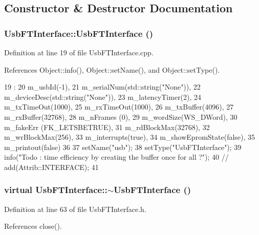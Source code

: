 \subsection{Constructor \& Destructor Documentation}
\hypertarget{classUsbFTInterface_aa0f871007821694c3e1f53f65cea8af4}{
\subsubsection[{UsbFTInterface}]{\setlength{\rightskip}{0pt plus 5cm}UsbFTInterface::UsbFTInterface ()}}
\label{classUsbFTInterface_aa0f871007821694c3e1f53f65cea8af4}


Definition at line 19 of file UsbFTInterface.cpp.

References Object::info(), Object::setName(), and Object::setType().


\begin{DoxyCode}
19                                  : 
20   m_usbId(-1),
21   m_serialNum(std::string("None")),
22   m_deviceDesc(std::string("None")),
23   m_latencyTimer(2),
24   m_txTimeOut(1000),
25   m_rxTimeOut(1000),
26   m_txBuffer(4096),
27   m_rxBuffer(32768),
28   m_nFrames (0),
29   m_wordSize(WS_DWord),
30   m_fakeErr (FK_LETSBETRUE),
31   m_rdBlockMax(32768),
32   m_wrBlockMax(256),
33   m_interrupts(true),
34   m_showEpromState(false),
35   m_printout(false)
36 { 
37   setName("usb");
38   setType("UsbFTInterface");
39   info("Todo : time efficiency by creating the buffer once for all ?");
40   //  add(Attrib::INTERFACE);
41 }
\end{DoxyCode}
\hypertarget{classUsbFTInterface_ad1fb563d0ff5f76aa833d02e65d4204a}{
\subsubsection[{$\sim$UsbFTInterface}]{\setlength{\rightskip}{0pt plus 5cm}virtual UsbFTInterface::$\sim$UsbFTInterface ()}}
\label{classUsbFTInterface_ad1fb563d0ff5f76aa833d02e65d4204a}


Definition at line 63 of file UsbFTInterface.h.

References close().


